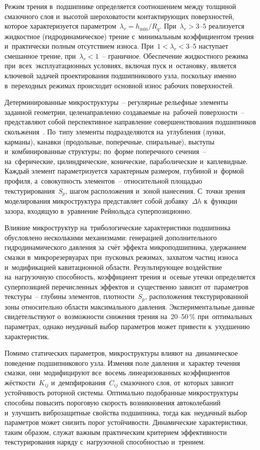 Режим трения в~подшипнике определяется соотношением между
толщиной смазочного слоя и~высотой шероховатости
контактирующих поверхностей, которое характеризуется
параметром~$\lambda_r = h_{\min}/R_q$. При~$\lambda_r > 3$--$5$
реализуется жидкостное (гидродинамическое) трение
с~минимальным коэффициентом трения и~практически полным
отсутствием износа. При~$1 < \lambda_r < 3$--$5$ наступает
смешанное трение, при~$\lambda_r < 1$~-- граничное. Обеспечение
жидкостного режима при~всех~эксплуатационных условиях, включая
пуск и~остановку, является ключевой задачей проектирования
подшипникового узла, поскольку именно в~переходных режимах
происходит основной износ рабочих поверхностей.

Детерминированные микроструктуры~-- регулярные рельефные
элементы заданной геометрии, целенаправленно создаваемые
на~рабочей поверхности~-- представляют собой перспективное
направление совершенствования подшипников скольжения~\cite{senatore2018,bashmur2021}. По~типу
элементы подразделяются на~углубления (лунки, карманы),
канавки (продольные, поперечные, спиральные), выступы
и~комбинированные структуры; по~форме поперечного сечения~--
на~сферические, цилиндрические, конические, параболические
и~каплевидные. Каждый элемент параметризуется характерным
размером, глубиной и~формой профиля, а~совокупность
элементов~-- относительной площадью текстурирования~$S_p$,
шагом расположения и~зоной нанесения. С~точки зрения
моделирования микроструктура представляет собой
добавку~$\Delta h$ к~функции зазора, входящую в~уравнение
Рейнольдса суперпозиционно.

Влияние микроструктур на~трибологические характеристики
подшипника обусловлено несколькими механизмами: генерацией
дополнительного гидродинамического давления за~счёт эффекта
микроподшипника, удержанием смазки в~микрорезервуарах
при~пусковых режимах, захватом частиц износа и~модификацией
кавитационной области. Результирующее воздействие
на~нагрузочную способность, коэффициент трения и~осевые
утечки определяется суперпозицией перечисленных эффектов
и~существенно зависит от~параметров текстуры~-- глубины
элементов, плотности~$S_p$, расположения текстурированной зоны
относительно области максимального давления. Экспериментальные
данные свидетельствуют о~возможности снижения трения
на~20--50\,\% при~оптимальных параметрах, однако неудачный
выбор параметров может привести к~ухудшению характеристик.

Помимо статических параметров, микроструктуры влияют
на~динамическое поведение подшипникового узла. Изменяя поле
давления и~характер течения смазки, они~модифицируют
все~восемь линеаризованных коэффициентов жёсткости~$K_{ij}$
и~демпфирования~$C_{ij}$ смазочного слоя, от~которых зависит
устойчивость роторной системы. Оптимально подобранные
микроструктуры способны повысить пороговую скорость
возникновения автоколебаний и~улучшить виброзащитные свойства
подшипника, тогда как~неудачный выбор параметров может снизить
порог устойчивости. Динамические характеристики, таким образом,
служат важным практическим критерием эффективности
текстурирования наряду с~нагрузочной способностью и~трением.

